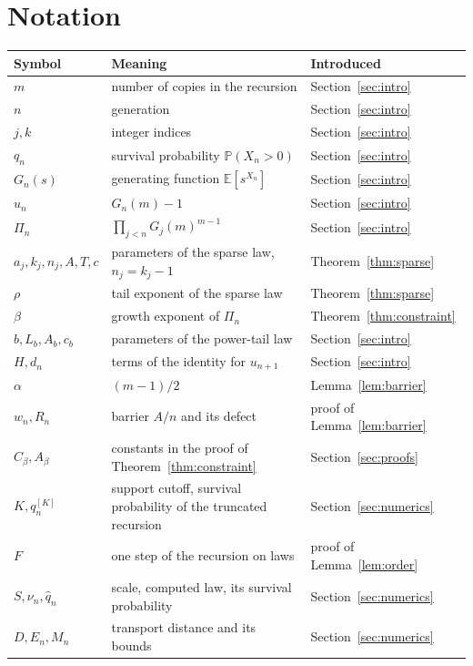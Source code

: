 \documentclass[11pt]{amsart}
\theoremstyle{remark}
\numberwithin{equation}{section}
\newcommand{\PP}{\mathbb{P}}
\newcommand{\EE}{\mathbb{E}}
\begin{document}
\appendix
\section{Notation}\label{app:notation}
\begin{center}
\begin{tabular}{l>{\raggedright\arraybackslash}p{5.2cm}l}
\toprule
Symbol & Meaning & Introduced\\
\midrule
$m$ & number of copies in the recursion & Section~\ref{sec:intro}\\
$n$ & generation & Section~\ref{sec:intro}\\
$j,k$ & integer indices & Section~\ref{sec:intro}\\
$q_n$ & survival probability $\PP(X_n>0)$ & Section~\ref{sec:intro}\\
$G_n(s)$ & generating function $\EE[s^{X_n}]$ & Section~\ref{sec:intro}\\
$u_n$ & $G_n(m)-1$ & Section~\ref{sec:intro}\\
$\Pi_n$ & $\prod_{j<n}G_j(m)^{m-1}$ & Section~\ref{sec:intro}\\
$a_j,k_j,n_j,A,T,c$ & parameters of the sparse law, $n_j=k_j-1$ & Theorem~\ref{thm:sparse}\\
$\rho$ & tail exponent of the sparse law & Theorem~\ref{thm:sparse}\\
$\beta$ & growth exponent of $\Pi_n$ & Theorem~\ref{thm:constraint}\\
$b,L_b,A_b,c_b$ & parameters of the power-tail law & Section~\ref{sec:intro}\\
$H,d_n$ & terms of the identity for $u_{n+1}$ & Section~\ref{sec:intro}\\
$\alpha$ & $(m-1)/2$ & Lemma~\ref{lem:barrier}\\
$w_n,R_n$ & barrier $A/n$ and its defect & proof of Lemma~\ref{lem:barrier}\\
$C_\beta,A_\beta$ & constants in the proof of Theorem~\ref{thm:constraint} & Section~\ref{sec:proofs}\\
$K,q_n^{[K]}$ & support cutoff, survival probability of the truncated recursion & Section~\ref{sec:numerics}\\
$F$ & one step of the recursion on laws & proof of Lemma~\ref{lem:order}\\
$S,\nu_n,\widehat q_n$ & scale, computed law, its survival probability & Section~\ref{sec:numerics}\\
$D,E_n,M_n$ & transport distance and its bounds & Section~\ref{sec:numerics}\\

\end{tabular}
\end{center}
\end{document}
